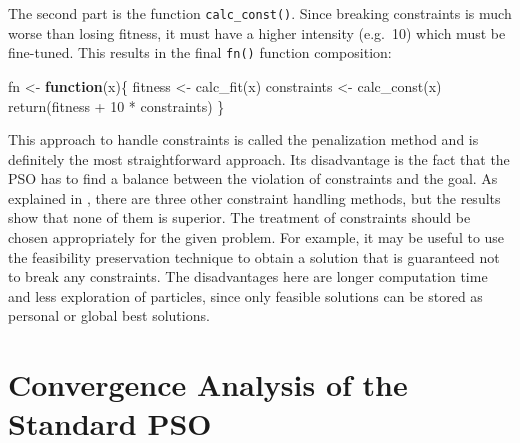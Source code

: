 \documentclass[
  oneside, a4paper, 12pt, openany]{book}
\newenvironment{Shaded}{\begin{snugshade}}{\end{snugshade}}
\newcommand{\ControlFlowTok}[1]{\textcolor[rgb]{0.13,0.29,0.53}{\textbf{#1}}}
\newcommand{\DecValTok}[1]{\textcolor[rgb]{0.00,0.00,0.81}{#1}}
\newcommand{\FunctionTok}[1]{\textcolor[rgb]{0.00,0.00,0.00}{#1}}
\newcommand{\NormalTok}[1]{#1}
\newcommand{\OtherTok}[1]{\textcolor[rgb]{0.56,0.35,0.01}{#1}}
\newcommand{\SpecialCharTok}[1]{\textcolor[rgb]{0.00,0.00,0.00}{#1}}
\theoremstyle{definition}
\theoremstyle{definition}
\theoremstyle{definition}
\theoremstyle{definition}
\theoremstyle{remark}
\begin{document}
\normalsize\vspace{0.1cm}

The second part is the function \texttt{calc\_const()}. Since breaking constraints is much worse than losing fitness, it must have a higher intensity (e.g.~10) which must be fine-tuned. This results in the final \texttt{fn()} function composition:

\vspace{0.1cm}\fontsize{11}{12}\selectfont

\begin{Shaded}
\begin{Highlighting}[]
\NormalTok{fn }\OtherTok{\textless{}{-}} \ControlFlowTok{function}\NormalTok{(x)\{}
\NormalTok{  fitness }\OtherTok{\textless{}{-}} \FunctionTok{calc\_fit}\NormalTok{(x)}
\NormalTok{  constraints }\OtherTok{\textless{}{-}} \FunctionTok{calc\_const}\NormalTok{(x)}
  \FunctionTok{return}\NormalTok{(fitness }\SpecialCharTok{+} \DecValTok{10} \SpecialCharTok{*}\NormalTok{ constraints)}
\NormalTok{\}}
\end{Highlighting}
\end{Shaded}

\normalsize\vspace{0.1cm}

This approach to handle constraints is called the penalization method and is definitely the most straightforward approach. Its disadvantage is the fact that the PSO has to find a balance between the violation of constraints and the goal. As explained in \citep{InSi2008}, there are three other constraint handling methods, but the results show that none of them is superior. The treatment of constraints should be chosen appropriately for the given problem. For example, it may be useful to use the feasibility preservation technique to obtain a solution that is guaranteed not to break any constraints. The disadvantages here are longer computation time and less exploration of particles, since only feasible solutions can be stored as personal or global best solutions.

\hypertarget{convergence-analysis-of-the-standard-pso}{%
\section{Convergence Analysis of the Standard PSO}\label{convergence-analysis-of-the-standard-pso}}
\end{document}
